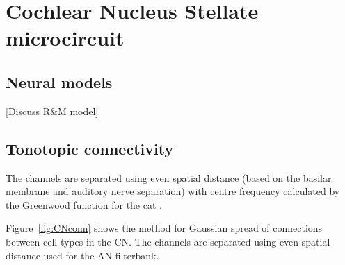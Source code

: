 


\section{Cochlear Nucleus Stellate microcircuit}

\subsection{Neural models}

[Discuss R\&M model]

\medskip{}

\subsection{Tonotopic connectivity}

The channels are separated using even spatial distance (based on the
basilar membrane and auditory nerve separation) with centre frequency
calculated by the Greenwood function for the cat
\citep{Greenwood:1990}. 

\medskip{}

Figure~\ref{fig:CNconn} shows the method for Gaussian spread of
connections between cell types in the CN\@.  The channels are separated
using even spatial distance used for the AN filterbank.


